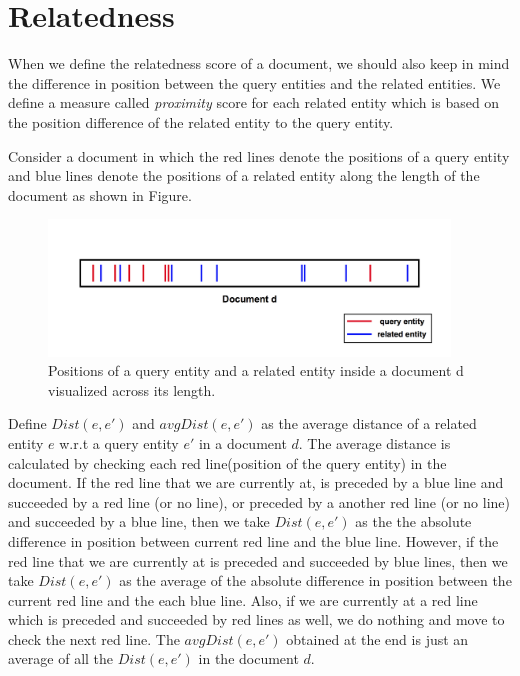 \documentclass[10pt,a4paper]{article} %
\begin{document}
    \section{Relatedness}
    
    When we define the relatedness score of a document, we should also keep in mind the difference in position 
    between the query entities and the related entities. We define a measure called {\em proximity} score for 
    each related entity which is based on the position difference of the related entity to the query entity.
    
    \noindent Consider a document in which the red lines denote the positions of a query entity and 
    blue lines denote the positions of a related entity along the length of the document
    as shown in Figure.
    
    \begin{figure}[ht]
	\centering
	\includegraphics[width=0.95\textwidth]{entity_positions_in_doc.jpg}
	\caption{Positions of a query entity and a related entity inside a document d visualized across its length.}
	\label{fig:entity_positions_in_doc}
    \end{figure}

    \noindent Define $Dist(e,e')$ and $avgDist(e,e')$ as the average distance of a related entity $e$ w.r.t a query entity $e'$ in a document $d$. 
    The average distance is calculated by checking each red line(position of the query entity) 
    in the document. If the red line that we are currently at, is preceded by a blue line and succeeded by a red line (or no line), or preceded by a another red line (or no line) and succeeded by a blue line, then we take $Dist(e,e')$ as the the absolute difference in position between current red line and the blue line. 
    However, if the red line that we are currently at is preceded and succeeded by blue lines, then we take $Dist(e,e')$ as the average of the absolute difference in position between the current red line and the each blue line.
    Also, if we are currently at a red line which is preceded and succeeded by red lines as well, we do nothing and 
    move to check the next red line.
    The $avgDist(e,e')$ obtained at the end is just an average of all the $Dist(e,e')$ in the document $d$. 
    
\end{document}
